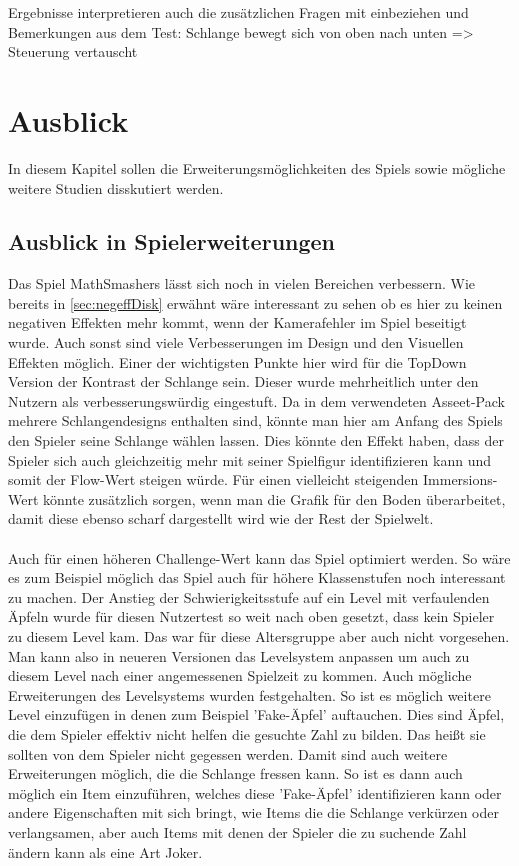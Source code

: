 Ergebnisse interpretieren auch die zusätzlichen Fragen mit einbeziehen und Bemerkungen aus dem Test: Schlange bewegt sich von oben nach unten => Steuerung vertauscht
\section{Ausblick}
\label{sec:ausblickDisk}
In diesem Kapitel sollen die Erweiterungsmöglichkeiten des Spiels sowie mögliche weitere Studien disskutiert werden.
\subsection{Ausblick in Spielerweiterungen}
Das Spiel MathSmashers lässt sich noch in vielen Bereichen verbessern. Wie bereits in \ref{sec:negeffDisk} erwähnt wäre interessant zu sehen ob es hier zu keinen negativen Effekten mehr kommt, wenn der Kamerafehler im Spiel beseitigt wurde. Auch sonst sind viele Verbesserungen im Design und den Visuellen Effekten möglich. Einer der wichtigsten Punkte hier wird für die TopDown Version der Kontrast der Schlange sein. Dieser wurde mehrheitlich unter den Nutzern als verbesserungswürdig eingestuft. Da in dem verwendeten Asseet-Pack mehrere Schlangendesigns enthalten sind, könnte man hier am Anfang des Spiels den Spieler seine Schlange wählen lassen. Dies könnte den Effekt haben, dass der Spieler sich auch gleichzeitig mehr mit seiner Spielfigur identifizieren kann und somit der Flow-Wert steigen würde. Für einen vielleicht steigenden Immersions-Wert könnte zusätzlich sorgen, wenn man die Grafik für den Boden überarbeitet, damit diese ebenso scharf dargestellt wird wie der Rest der Spielwelt.\\
\\
Auch für einen höheren Challenge-Wert kann das Spiel optimiert werden. So wäre es zum Beispiel möglich das Spiel auch für höhere Klassenstufen noch interessant zu machen. Der Anstieg der Schwierigkeitsstufe auf ein Level mit verfaulenden Äpfeln wurde für diesen Nutzertest so weit nach oben gesetzt, dass kein Spieler zu diesem Level kam. Das war für diese Altersgruppe aber auch nicht vorgesehen. Man kann also in neueren Versionen das Levelsystem anpassen um auch zu diesem Level nach einer angemessenen Spielzeit zu kommen. Auch mögliche Erweiterungen des Levelsystems wurden festgehalten. So ist es möglich weitere Level einzufügen in denen zum Beispiel 'Fake-Äpfel' auftauchen. Dies sind Äpfel, die dem Spieler effektiv nicht helfen die gesuchte Zahl zu bilden. Das heißt sie sollten von dem Spieler nicht gegessen werden. Damit sind auch weitere Erweiterungen möglich, die die Schlange fressen kann. So ist es dann auch möglich ein Item einzuführen, welches diese 'Fake-Äpfel' identifizieren kann oder andere Eigenschaften mit sich bringt, wie Items die die Schlange verkürzen oder verlangsamen, aber auch Items mit denen der Spieler die zu suchende Zahl ändern kann als eine Art Joker.
